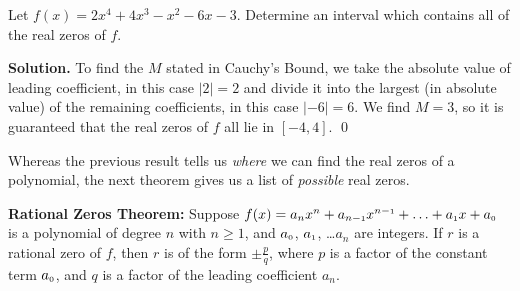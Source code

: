 \begin{ex} \label{CBex} Let $f(x) = 2x^4+4x^3-x^2-6x-3$.  Determine an interval which contains all of the real zeros of $f$.

\smallskip

{\bf Solution.} To find the $M$ stated in Cauchy's Bound, we take the absolute value of leading coefficient, in this case $|2| = 2$ and divide it into the largest (in absolute value) of the remaining coefficients, in this case $|-6| = 6$.   We find  $M=3$, so it is guaranteed that the real zeros of $f$ all lie in $[-4,4]$.  \qed

\end{ex}

Whereas the previous result tells us \textit{where} we can find the real zeros of a polynomial, the next theorem gives us a list of \textit{possible} real zeros.

\smallskip

\colorbox{ResultColor}{\bbm

\begin{thm} \label{RZT}\textbf{Rational Zeros Theorem:}  Suppose $f(x) = a_{n} x^{n} + a_{n-\mbox{\tiny$1$}}x^{n-\mbox{\tiny$1$}} + \ldots + a_{\mbox{\tiny$1$}} x + a_{\mbox{\tiny$0$}}$ is a polynomial of degree $n$ with $n \geq 1$, and $a_{\mbox{\tiny$0$}}$, $a_{\mbox{\tiny$1$}}$, \ldots $a_{n}$ are integers.  If $r$ is a rational zero of $f$, then $r$ is of the form $\pm \frac{p}{q}$, where $p$ is a factor of the constant term $a_{\mbox{\tiny$0$}}$, and $q$ is a factor of the leading coefficient $a_{n}$.  
\end{thm}

\ebm}

\smallskip

